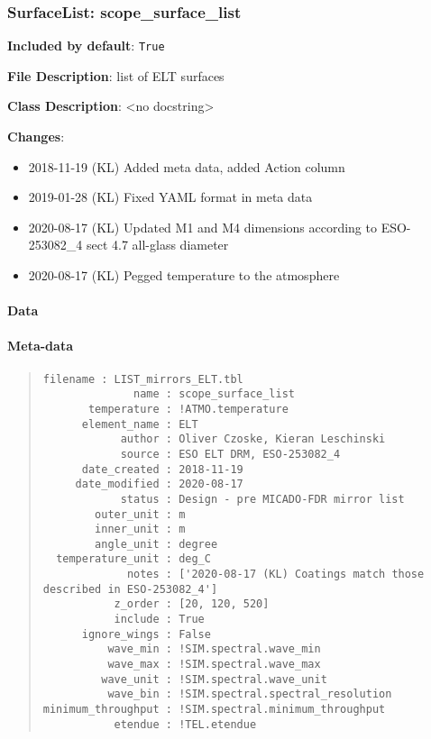 \subsubsection{SurfaceList: \textquotedbl{}scope\_surface\_list\textquotedbl{}%
  \label{surfacelist-scope-surface-list}%
}

\textbf{Included by default}: \texttt{True}

\textbf{File Description}: list of ELT surfaces

\textbf{Class Description}: <no docstring>

\textbf{Changes}:

\begin{itemize}
\item 2018-11-19 (KL) Added meta data, added Action column

\item 2019-01-28 (KL) Fixed YAML format in meta data

\item 2020-08-17 (KL) Updated M1 and M4 dimensions according to ESO-253082\_4 sect 4.7 \textquotedbl{}all-glass\textquotedbl{} diameter

\item 2020-08-17 (KL) Pegged temperature to the atmosphere
\end{itemize}


\paragraph{Data%
  \label{data}%
}


\paragraph{Meta-data%
  \label{meta-data}%
}

\begin{quote}
\begin{alltt}
\begin{lstlisting}[frame=single]
          filename : LIST_mirrors_ELT.tbl
              name : scope_surface_list
       temperature : !ATMO.temperature
      element_name : ELT
            author : Oliver Czoske, Kieran Leschinski
            source : ESO ELT DRM, ESO-253082_4
      date_created : 2018-11-19
     date_modified : 2020-08-17
            status : Design - pre MICADO-FDR mirror list
        outer_unit : m
        inner_unit : m
        angle_unit : degree
  temperature_unit : deg_C
             notes : ['2020-08-17 (KL) Coatings match those described in ESO-253082_4']
           z_order : [20, 120, 520]
           include : True
      ignore_wings : False
          wave_min : !SIM.spectral.wave_min
          wave_max : !SIM.spectral.wave_max
         wave_unit : !SIM.spectral.wave_unit
          wave_bin : !SIM.spectral.spectral_resolution
minimum_throughput : !SIM.spectral.minimum_throughput
           etendue : !TEL.etendue
\end{lstlisting}
\end{alltt}
\end{quote}


